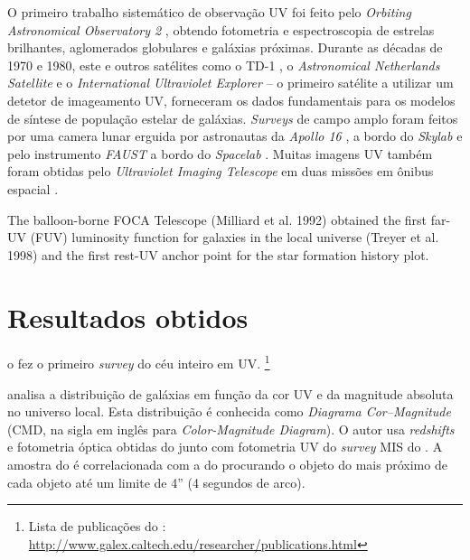 O primeiro trabalho sistemático de observação UV foi feito pelo {\em Orbiting
Astronomical Observatory 2} \citep{Code1970}, obtendo fotometria e
espectroscopia de estrelas brilhantes, aglomerados globulares e galáxias
próximas. Durante as décadas de 1970 e 1980, este e outros satélites como o TD-1
\citep{Boksenberg1973}, o {\em Astronomical Netherlands Satellite}
\citep{vanDuinen1975} e o {\em International Ultraviolet Explorer}
\citep{Kondo1987} -- o primeiro satélite a utilizar um detetor de imageamento
UV, forneceram os dados fundamentais para os modelos de síntese de população
estelar de galáxias. {\em Surveys} de campo amplo foram feitos por uma camera
lunar erguida por astronautas da {\em Apollo 16} \citep{Carruthers1973}, a bordo
do {\em Skylab} \citep{Henize1975} e pelo instrumento {\em FAUST} a bordo do
{\em Spacelab} \citep{Bowyer1993}. Muitas imagens UV também foram obtidas pelo
{\em Ultraviolet Imaging Telescope} em duas missões em ônibus espacial
\citep{Stecher1997}.

\cite{Madau1998}
The balloon-borne FOCA Telescope (Milliard et al. 1992) obtained the
first far- UV (FUV) luminosity function for galaxies in the local universe
(Treyer et al. 1998) and the first rest-UV anchor point for the star formation
history plot.



\section{Resultados obtidos}
\label{sec:Galex:Resultados}

o \galex fez o primeiro {\em survey} do céu inteiro em UV. 
\footnote{Lista de publicações do \galex:
\url{http://www.galex.caltech.edu/researcher/publications.html}}



\cite{Wyder2007} analisa a distribuição de galáxias em função da cor UV e da
magnitude absoluta no universo local. Esta distribuição é conhecida como {\em
Diagrama Cor--Magnitude} (CMD, na sigla em inglês para {\em Color-Magnitude
Diagram}). O autor usa {\em redshifts} e fotometria óptica obtidas do \SDSS
junto com fotometria UV do {\em survey} MIS do \galex. A amostra do \SDSS é
correlacionada com a do \galex{} procurando o objeto do \galex mais próximo de
cada objeto \SDSS até um limite de 4'' (4 segundos de arco).

